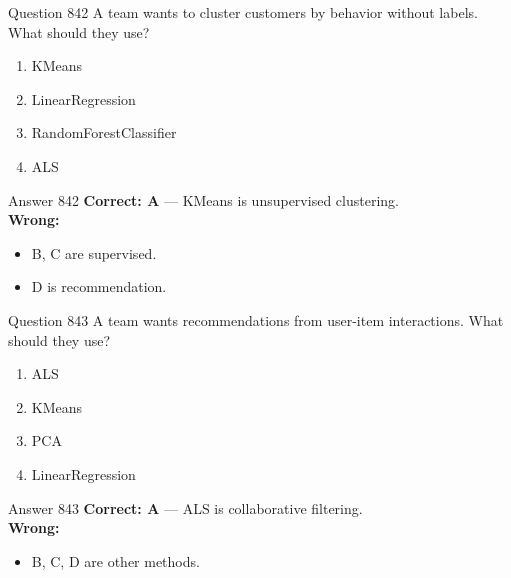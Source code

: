 \documentclass[aspectratio=169,11pt]{beamer}
\begin{document}
	\begin{frame}{Question 842}
		A team wants to cluster customers by behavior without labels. What should they use?
		\begin{enumerate}[label=\Alph*.]
			\item KMeans
			\item LinearRegression
			\item RandomForestClassifier
			\item ALS
		\end{enumerate}
	\end{frame}
	\begin{frame}{Answer 842}
		\textbf{Correct: A} --- KMeans is unsupervised clustering.\\
		\vspace{0.5em}
		\textbf{Wrong:}
		\begin{itemize}
			\item B, C are supervised.
			\item D is recommendation.
		\end{itemize}
	\end{frame}
	
	\begin{frame}{Question 843}
		A team wants recommendations from user-item interactions. What should they use?
		\begin{enumerate}[label=\Alph*.]
			\item ALS
			\item KMeans
			\item PCA
			\item LinearRegression
		\end{enumerate}
	\end{frame}
	\begin{frame}{Answer 843}
		\textbf{Correct: A} --- ALS is collaborative filtering.\\
		\vspace{0.5em}
		\textbf{Wrong:}
		\begin{itemize}
			\item B, C, D are other methods.
		\end{itemize}
	\end{frame}
	
\end{document}
